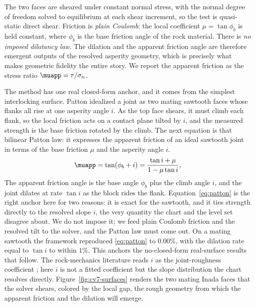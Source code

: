The two faces are sheared under constant normal stress, with the normal degree of freedom solved to equilibrium at each shear increment, so the test is quasi-static direct shear. Friction is \emph{plain Coulomb}: the local coefficient $\mu=\tan\phi_b$ is held constant, where $\phi_b$ is the base friction angle of the rock material. There is \emph{no imposed dilatancy law}. The dilation and the apparent friction angle are therefore emergent outputs of the resolved asperity geometry, which is precisely what makes geometric fidelity the entire story. We report the apparent friction as the stress ratio $\muapp=\tau/\sigma_n$.

The method has one real closed-form anchor, and it comes from the simplest interlocking surface. Patton \citep{patton1966multiple} idealized a joint as two mating sawtooth faces whose flanks all rise at one asperity angle $i$. As the top face shears, it must climb each flank, so the local friction acts on a contact plane tilted by $i$, and the measured strength is the base friction rotated by the climb. The next equation is that bilinear Patton law: it expresses the apparent friction of an ideal sawtooth joint in terms of the base friction $\mu$ and the asperity angle $i$.
%
\begin{equation}\label{eq:patton}
\muapp=\tan(\phi_b+i)=\frac{\tan i+\mu}{1-\mu\tan i},
\end{equation}
%
The apparent friction angle is the base angle $\phi_b$ plus the climb angle $i$, and the joint dilates at rate $\tan i$ as the block rides the flank. Equation~\eqref{eq:patton} is the right anchor here for two reasons: it is exact for the sawtooth, and it ties strength directly to the resolved slope $i$, the very quantity the chart and the level set disagree about. We do not impose it; we feed plain Coulomb friction and the resolved tilt to the solver, and the Patton law must come out. On a mating sawtooth the framework reproduced \eqref{eq:patton} to $0.00\%$, with the dilation rate equal to $\tan i$ to within $1\%$. This anchors the no-closed-form real-surface results that follow. The rock-mechanics literature reads $i$ as the joint-roughness coefficient \citep{barton1977shear,barton1990review}; here $i$ is not a fitted coefficient but the slope distribution the chart resolves directly. Figure~\ref{fig:cv7-surfaces} renders the two mating Inada faces that the solver shears, colored by the local gap, the rough geometry from which the apparent friction and the dilation will emerge.

